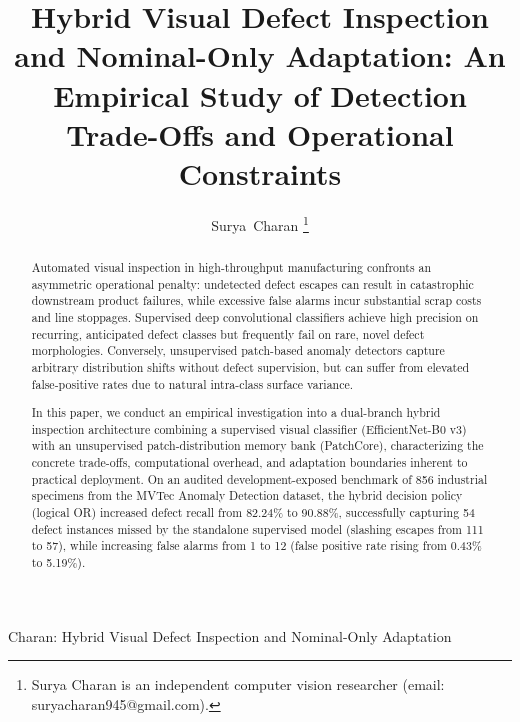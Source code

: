 \documentclass[journal]{IEEEtran}
\begin{document}
\title{Hybrid Visual Defect Inspection and Nominal-Only Adaptation: An Empirical Study of Detection Trade-Offs and Operational Constraints}

\author{Surya~Charan%
\thanks{Surya Charan is an independent computer vision researcher (email: suryacharan945@gmail.com).}%
}

%
{Charan: Hybrid Visual Defect Inspection and Nominal-Only Adaptation}

\maketitle

\begin{abstract}
Automated visual inspection in high-throughput manufacturing confronts an asymmetric operational penalty: undetected defect escapes can result in catastrophic downstream product failures, while excessive false alarms incur substantial scrap costs and line stoppages. Supervised deep convolutional classifiers achieve high precision on recurring, anticipated defect classes but frequently fail on rare, novel defect morphologies. Conversely, unsupervised patch-based anomaly detectors capture arbitrary distribution shifts without defect supervision, but can suffer from elevated false-positive rates due to natural intra-class surface variance. 

In this paper, we conduct an empirical investigation into a dual-branch hybrid inspection architecture combining a supervised visual classifier (EfficientNet-B0 v3) with an unsupervised patch-distribution memory bank (PatchCore), characterizing the concrete trade-offs, computational overhead, and adaptation boundaries inherent to practical deployment. On an audited development-exposed benchmark of 856 industrial specimens from the MVTec Anomaly Detection dataset, the hybrid decision policy (logical OR) increased defect recall from 82.24\% to 90.88\%, successfully capturing 54 defect instances missed by the standalone supervised model (slashing escapes from 111 to 57), while increasing false alarms from 1 to 12 (false positive rate rising from 0.43\% to 5.19\%). 


\end{abstract}
\end{document}
